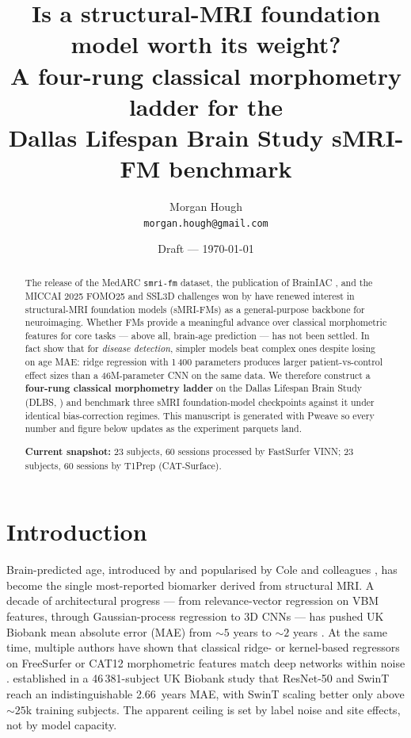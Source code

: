 \documentclass[11pt]{article}
\title{Is a structural-MRI foundation model worth its weight?\\
  A four-rung classical morphometry ladder for the\\
  Dallas Lifespan Brain Study sMRI-FM benchmark}
\author{Morgan Hough \\
  \texttt{morgan.hough@gmail.com}}
\date{Draft --- \today}
\begin{document}
\maketitle

\begin{abstract}
The release of the MedARC \texttt{smri-fm} dataset, the publication of
BrainIAC \citep{brainiac2026}, and the MICCAI 2025 FOMO25 and SSL3D
challenges won by \citet{gordaliza2026} have renewed interest in
structural-MRI foundation models (sMRI-FMs) as a general-purpose
backbone for neuroimaging. Whether FMs provide a meaningful advance
over classical morphometric features for core tasks --- above all,
brain-age prediction --- has not been settled. In fact
\citet{schulz2025} show that for \emph{disease detection}, simpler
models beat complex ones despite losing on age MAE: ridge regression
with 1\,400 parameters produces larger patient-vs-control effect sizes
than a 46M-parameter CNN on the same data. We therefore construct a
\textbf{four-rung classical morphometry ladder} on the Dallas Lifespan
Brain Study (DLBS, \citealp{park2025dlbs}) and benchmark three sMRI
foundation-model checkpoints against it under identical
bias-correction regimes. This manuscript is generated with Pweave so
every number and figure below updates as the experiment parquets land.



\textbf{Current snapshot:} 23 subjects, 60 sessions processed by FastSurfer VINN; 23 subjects, 60 sessions by T1Prep (CAT-Surface).

\end{abstract}

\section{Introduction}

Brain-predicted age, introduced by \citet{franke2010} and popularised
by Cole and colleagues \citep{cole2017}, has become the single
most-reported biomarker derived from structural MRI. A decade of
architectural progress --- from relevance-vector regression on VBM
features, through Gaussian-process regression \citep{cole2017,brainager}
to 3D CNNs \citep{peng2021sfcn} --- has pushed UK Biobank mean absolute
error (MAE) from $\sim 5$ years to $\sim 2$ years \citep{peng2021sfcn}.
At the same time, multiple authors have shown that classical ridge- or
kernel-based regressors on FreeSurfer or CAT12 morphometric features
match deep networks within noise \citep{more2023,lombardi2021,bashyam2020}.
\citet{gijsen2024} established in a 46\,381-subject UK Biobank study
that ResNet-50 and SwinT reach an indistinguishable \SI{2.66}{years}
MAE, with SwinT scaling better only above $\sim 25$k training subjects.
The apparent ceiling is set by label noise and site effects, not by
model capacity.
\end{document}

